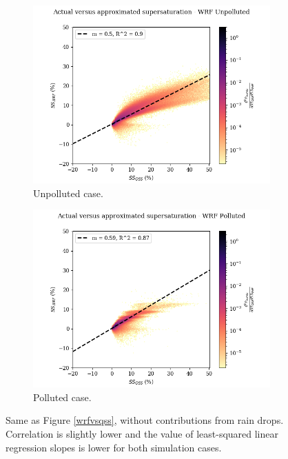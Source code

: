 \documentclass{article}
\begin{document}
\begin{figure}[ht]
	\centering
	\begin{subfigure}{0.7\textwidth}
		\includegraphics[width=\textwidth]{wrf/norainnovent_heatmap_ss_qss_vs_ss_wrf_Unpolluted_figure.png}
		\caption{Unpolluted case.}
		\label{norainnoventwrfvsqssunpoll}
	\end{subfigure}
	\begin{subfigure}{0.7\textwidth}
		\includegraphics[width=\textwidth]{wrf/norainnovent_heatmap_ss_qss_vs_ss_wrf_Polluted_figure.png}
		\caption{Polluted case.}
		\label{norainnoventwrfvsqsspoll}
	\end{subfigure}
	\caption{Same as Figure \ref{wrfvsqss}, without contributions from rain drops. Correlation is slightly lower and the value of least-squared linear regression slopes is lower for both simulation cases.}
	\label{norainnoventwrfvsqss}
\end{figure}
\end{document}
